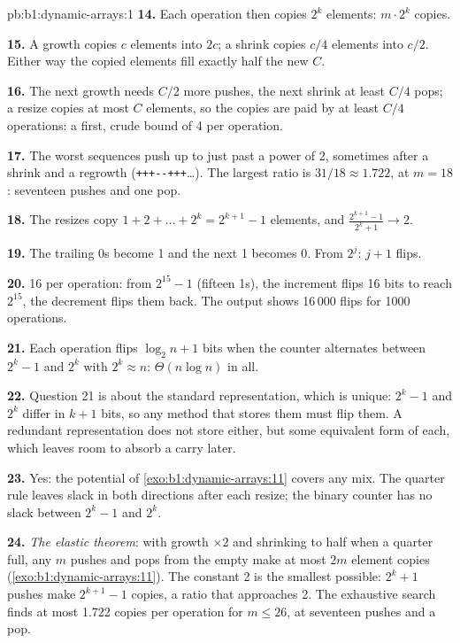 \begin{solution}{pb:b1:dynamic-arrays:1}
\textbf{14.} Each operation then copies $2^k$ elements: $m \cdot 2^k$ copies.

\textbf{15.} A growth copies $c$ elements into  $2c$; a shrink copies $c/4$ elements into  $c/2$. Either
way the copied elements fill exactly half the new  $C$.

\textbf{16.} The next growth needs $C/2$ more pushes, the next shrink at least $C/4$ pops; a resize copies at most $C$
elements, so the copies are paid by at least $C/4$ operations: a first, crude bound of 4 per operation.

\textbf{17.} The worst sequences push up to just past a power of 2, sometimes after a shrink and a regrowth
(\texttt{+++-{}-{}+++}\dots). The largest ratio is $31/18 \approx 1.722$, at $m = 18$: seventeen pushes and one pop.

\textbf{18.} The resizes copy $1 + 2 + \dots + 2^k = 2^{k+1} - 1$ elements, and $\frac{2^{k+1} - 1}{2^k + 1} \to 2$.

\textbf{19.} The trailing 0s become 1 and the next 1 becomes 0. From $2^j$: $j + 1$ flips.

\textbf{20.} 16 per operation: from $2^{15} - 1$ (fifteen 1s), the increment flips 16 bits to reach $2^{15}$, the
decrement flips them back. The output shows 16\,000 flips for 1000 operations.

\textbf{21.} Each operation flips $\log_2 n + 1$ bits when the counter alternates between $2^k - 1$ and $2^k$ with $2^k
\approx n$: $\Theta(n \log n)$ in all.

\textbf{22.} Question 21 is about the standard representation, which is unique: $2^k - 1$ and $2^k$ differ in $k + 1$
bits, so any method that stores them must flip them. A redundant representation does not store either, but some
equivalent form of each, which leaves room to absorb a carry later.

\textbf{23.} Yes: the potential of \cref{exo:b1:dynamic-arrays:11} covers any mix. The quarter rule leaves slack in both
directions after each resize; the binary counter has no slack between $2^k - 1$ and $2^k$.

\textbf{24.} \emph{The elastic  theorem}: with growth $\times 2$ and shrinking to half when a quarter full, any $m$
pushes and pops from the empty  make at most $2m$ element copies (\cref{exo:b1:dynamic-arrays:11}). The constant 2 is
the smallest possible: $2^k + 1$ pushes make $2^{k+1} - 1$ copies, a ratio that approaches 2. The exhaustive search finds
at most 1.722 copies per operation for $m \leq 26$, at seventeen pushes and a pop.
\end{solution}
